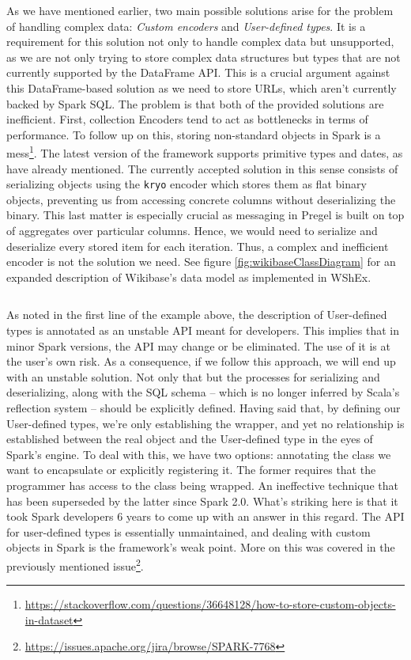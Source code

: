 As we have mentioned earlier, two main possible solutions arise for the problem of handling complex data: \textit{Custom encoders} and \textit{User-defined types}. It is a requirement for this solution not only to handle complex data but unsupported, as we are not only trying to store complex data structures but types that are not currently supported by the DataFrame API. This is a crucial argument against this DataFrame-based solution as we need to store URLs, which aren't currently backed by Spark SQL. The problem is that both of the provided solutions are inefficient. First, collection Encoders tend to act as bottlenecks in terms of performance. To follow up on this, storing non-standard objects in Spark is a mess\footnote{\url{https://stackoverflow.com/questions/36648128/how-to-store-custom-objects-in-dataset}}. The latest version of the framework supports primitive types and dates, as have already mentioned. The currently accepted solution in this sense consists of serializing objects using the \texttt{kryo} encoder which stores them as flat binary objects, preventing us from accessing concrete columns without deserializing the binary. This last matter is especially crucial as messaging in Pregel is built on top of aggregates over particular columns. Hence, we would need to serialize and deserialize every stored item for each iteration. Thus, a  complex and inefficient encoder is not the solution we need. See figure \ref{fig:wikibaseClassDiagram} for an expanded description of Wikibase's data model as implemented in WShEx.

\begin{code}
    \inputminted{scala}{code/listings/8-1_udt.scala}
\end{code}

As noted in the first line of the example above, the description of User-defined types is annotated as an unstable API meant for developers. This implies that in minor Spark versions, the API may change or be eliminated. The use of it is at the user's own risk. As a consequence, if we follow this approach, we will end up with an unstable solution. Not only that but the processes for serializing and deserializing, along with the SQL schema -- which is no longer inferred by Scala's reflection system -- should be explicitly defined. Having said that, by defining our User-defined types, we're only establishing the wrapper, and yet no relationship is established between the real object and the User-defined type in the eyes of Spark's engine. To deal with this, we have two options: annotating the class we want to encapsulate or explicitly registering it. The former requires that the programmer has access to the class being wrapped. An ineffective technique that has been superseded by the latter since Spark 2.0. What's striking here is that it took Spark developers 6 years to come up with an answer in this regard. The API for user-defined types is essentially unmaintained, and dealing with custom objects in Spark is the framework's weak point. More on this was covered in the previously mentioned issue\footnote{\url{https://issues.apache.org/jira/browse/SPARK-7768}}.


